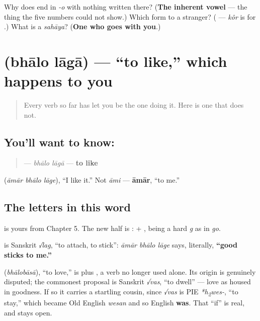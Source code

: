 \begin{tcolorbox}[breakable,colback=teal!4,colframe=teal!35!black,title={Before you move on}]
Why does  end in \emph{-o} with nothing written there? (\textbf{The inherent vowel} — the thing the five numbers could not show.) Which form to a stranger? (\textbf{} — \emph{kôr} is for .) What is a \emph{sahāya}? (\textbf{One who goes with you}.)
\end{tcolorbox}
\section[\texorpdfstring{\bn{ভালো} \bn{লাগা} (bhālo lāgā)}{ভালো লাগা (bhālo lāgā)}]{  (bhālo lāgā) — \textquotedblleft{}to like,\textquotedblright{} which happens to you}

\label{lesson:BN-C09-bhalo-laga}



\begin{quote}
Every verb so far has let you be the one doing it. Here is one that does not.
\end{quote}

\subsection*{You'll want to know:  }
\begin{quote}
\textbf{ } — \emph{bhālo lāgā} — \textbf{to like}
\end{quote}

   (\emph{āmār bhālo lāge}), \textquotedblleft{}I like it.\textquotedblright{} Not \emph{āmi} — \textbf{āmār}, \textquotedblleft{}to me.\textquotedblright{}

\subsection*{The letters in this word}
\textbf{} is yours from Chapter 5. The new half is \textbf{}: \textbf{} + \textbf{}, \textbf{} being a hard \emph{g} as in \emph{go}.

\begin{cousinweb}
\textbf{} is Sanskrit \emph{√lag}, \textquotedblleft{}to attach, to stick\textquotedblright{}: \emph{āmār bhālo lāge} says, literally, \textbf{\textquotedblleft{}good sticks to me.\textquotedblright{}}

\textbf{} (\emph{bhālobāsā}), \textquotedblleft{}to love,\textquotedblright{} is  plus \textbf{}, a verb no longer used alone. Its origin is genuinely disputed; the commonest proposal is Sanskrit \emph{√vas}, \textquotedblleft{}to dwell\textquotedblright{} — love as housed in goodness. If so it carries a startling cousin, since \emph{√vas} is PIE \emph{*h\textsubscript{2}wes-}, \textquotedblleft{}to stay,\textquotedblright{} which became Old English \emph{wesan} and so English \textbf{was}. That \textquotedblleft{}if\textquotedblright{} is real, and stays open.
\end{cousinweb}

